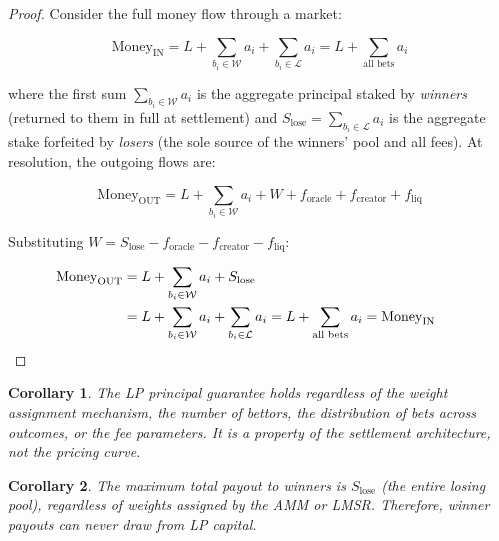 \documentclass{ledger}
\theoremstyle{plain}
\newtheorem{corollary}{Corollary}
\theoremstyle{remark}
\begin{document}
\begin{proof}
Consider the full money flow through a market:

\[
\text{Money}_{\text{IN}} = L + \sum_{b_i \in \mathcal{W}} a_i +
\sum_{b_i \in \mathcal{L}} a_i = L + \sum_{\text{all bets}} a_i
\]

where the first sum $\sum_{b_i \in \mathcal{W}} a_i$ is the aggregate principal
staked by \emph{winners} (returned to them in full at settlement) and
$S_{\text{lose}} = \sum_{b_i \in \mathcal{L}} a_i$ is the aggregate stake
forfeited by \emph{losers} (the sole source of the winners' pool and all fees).
At resolution, the outgoing flows are:

\[
\text{Money}_{\text{OUT}} = L + \sum_{b_i \in \mathcal{W}} a_i + W +
f_{\text{oracle}} + f_{\text{creator}} + f_{\text{liq}}
\]

Substituting $W = S_{\text{lose}} - f_{\text{oracle}} - f_{\text{creator}} -
f_{\text{liq}}$:

\begin{align*}
\text{Money}_{\text{OUT}}
&= L + \sum_{b_i \in \mathcal{W}} a_i + S_{\text{lose}} \\
&= L + \sum_{b_i \in \mathcal{W}} a_i + \sum_{b_i \in \mathcal{L}} a_i
 = L + \sum_{\text{all bets}} a_i = \text{Money}_{\text{IN}} \qquad \qedhere
\end{align*}
\end{proof}

\begin{corollary}
The LP principal guarantee holds regardless of the weight assignment mechanism,
the number of bettors, the distribution of bets across outcomes, or the fee
parameters. It is a property of the settlement architecture, not the pricing
curve.
\end{corollary}

\begin{corollary}
The maximum total payout to winners is $S_{\text{lose}}$ (the entire losing
pool), regardless of weights assigned by the AMM or LMSR. Therefore, winner
payouts can never draw from LP capital.
\end{corollary}
\end{document}
